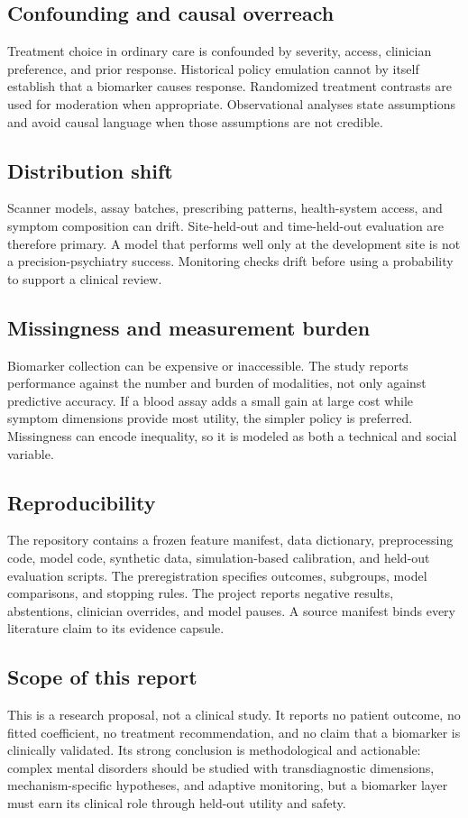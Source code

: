 \documentclass[conference]{IEEEtran}
\begin{document}
\subsection{Confounding and causal overreach}
Treatment choice in ordinary care is confounded by severity, access, clinician preference, and prior response. Historical policy emulation cannot by itself establish that a biomarker causes response. Randomized treatment contrasts are used for moderation when appropriate. Observational analyses state assumptions and avoid causal language when those assumptions are not credible.

\subsection{Distribution shift}
Scanner models, assay batches, prescribing patterns, health-system access, and symptom composition can drift. Site-held-out and time-held-out evaluation are therefore primary. A model that performs well only at the development site is not a precision-psychiatry success. Monitoring checks drift before using a probability to support a clinical review.

\subsection{Missingness and measurement burden}
Biomarker collection can be expensive or inaccessible. The study reports performance against the number and burden of modalities, not only against predictive accuracy. If a blood assay adds a small gain at large cost while symptom dimensions provide most utility, the simpler policy is preferred. Missingness can encode inequality, so it is modeled as both a technical and social variable.

\subsection{Reproducibility}
The repository contains a frozen feature manifest, data dictionary, preprocessing code, model code, synthetic data, simulation-based calibration, and held-out evaluation scripts. The preregistration specifies outcomes, subgroups, model comparisons, and stopping rules. The project reports negative results, abstentions, clinician overrides, and model pauses. A source manifest binds every literature claim to its evidence capsule.

\subsection{Scope of this report}
This is a research proposal, not a clinical study. It reports no patient outcome, no fitted coefficient, no treatment recommendation, and no claim that a biomarker is clinically validated. Its strong conclusion is methodological and actionable: complex mental disorders should be studied with transdiagnostic dimensions, mechanism-specific hypotheses, and adaptive monitoring, but a biomarker layer must earn its clinical role through held-out utility and safety.
\end{document}
